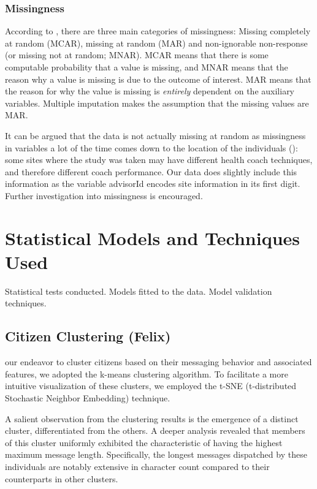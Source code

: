 \documentclass[12pt]{article}
\begin{document}
	\subsubsection{Missingness}
	
	According to \cite{rarnorld1}, there are three main categories of missingness: Missing completely at random (MCAR), missing at random (MAR) and non-ignorable non-response (or missing not at random; MNAR). MCAR means that there is some computable probability that a value is missing, and MNAR means that the reason why a value is missing is due to the outcome of interest. MAR means that the reason for why the value is missing is \emph{entirely} dependent on the auxiliary variables. Multiple imputation makes the assumption that the missing values are MAR.
	
	It can be argued that the data is not actually missing at random as missingness in variables a lot of the time comes down to the location of the individuals (\cite{kangh1}): some sites where the study was taken may have different health coach techniques, and therefore different coach performance. Our data does slightly include this information as the variable \textsf{advisorId} encodes site information in its first digit. Further investigation into missingness is encouraged.

\section{Statistical Models and Techniques Used}

\label{s.stats}

Statistical tests conducted.
Models fitted to the data.
Model validation techniques.


\subsection{Citizen Clustering (Felix)}

our endeavor to cluster citizens based on their messaging behavior and associated features, we adopted the k-means clustering algorithm. To facilitate a more intuitive visualization of these clusters, we employed the t-SNE (t-distributed Stochastic Neighbor Embedding) technique. 

A salient observation from the clustering results is the emergence of a distinct cluster, differentiated from the others. A deeper analysis revealed that members of this cluster uniformly exhibited the characteristic of having the highest maximum message length. Specifically, the longest messages dispatched by these individuals are notably extensive in character count compared to their counterparts in other clusters.
\end{document}
